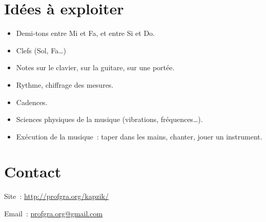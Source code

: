\documentclass[11pt]{article}
\begin{document}

\section{Idées à exploiter}

\begin{itemize}
\item Demi-tons entre Mi et Fa, et entre Si et Do.
\item Clefs (Sol, Fa…)
\item Notes sur le clavier, sur la guitare, sur une portée.
\item Rythme, chiffrage des mesures.
\item Cadences.
\item Sciences physiques de la musique (vibrations, fréquences…).
\item Exécution de la musique : taper dans les mains, chanter, jouer un
    instrument.
\end{itemize}

\section{Contact} \label{contact}

\setlength{\parindent}{0pt}

Site~: \url{http://profgra.org/kapzik/}

Email~: \url{profgra.org@gmail.com}
\end{document}
